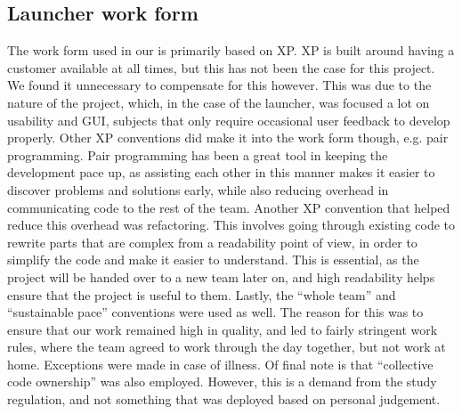 \subsection{Launcher work form}
The work form used in our \localgroup{} is primarily based on XP. 
XP is built around having a customer available at all times, but this has not been the case for this project. 
We found it unnecessary to compensate for this however. 
This was due to the nature of the project, which, in the case of the launcher, was focused a lot on usability and GUI, subjects that only require occasional user feedback to develop properly. \newline
Other XP conventions did make it into the work form though, e.g. pair programming. 
Pair programming has been a great tool in keeping the development pace up, as assisting each other in this manner makes it easier to discover problems and solutions early, while also reducing overhead in communicating code to the rest of the team. \newline
Another XP convention that helped reduce this overhead was refactoring. 
This involves going through existing code to rewrite parts that are complex from a readability point of view, in order to simplify the code and make it easier to understand. 
This is essential, as the project will be handed over to a new team later on, and high readability helps ensure that the project is useful to them. \newline
Lastly, the \textquotedblleft{}whole team\textquotedblright{} and \textquotedblleft{}sustainable pace\textquotedblright{} conventions were used as well. 
The reason for this was to ensure that our work remained high in quality, and led to fairly stringent work rules, where the team agreed to work through the day together, but not work at home. 
Exceptions were made in case of illness. \newline
Of final note is that \textquotedblleft{}collective code ownership\textquotedblright{} was also employed. 
However, this is a demand from the study regulation, and not something that was deployed based on personal judgement. 